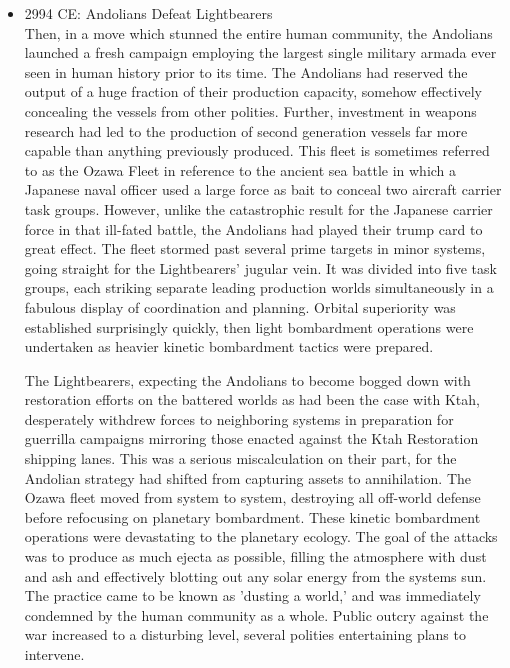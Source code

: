 \begin{itemize}
\item 2994 CE: Andolians Defeat Lightbearers \\

Then, in a move which stunned the entire human community, the
Andolians launched a fresh campaign employing the largest single
military armada ever seen in human history prior to its time.  The
Andolians had reserved the output of a huge fraction of their
production capacity, somehow effectively concealing the vessels from
other polities.  Further, investment in weapons research had led to
the production of second generation vessels far more capable than
anything previously produced.  This fleet is sometimes referred to as the
Ozawa Fleet in reference to the ancient sea battle in which a Japanese
naval officer used a large force as bait to conceal two aircraft
carrier task groups.  However, unlike the catastrophic result for the
Japanese carrier force in that ill-fated battle, the Andolians had
played their trump card to great effect.  The fleet stormed past several
prime targets in minor systems, going straight for the Lightbearers'
jugular vein.  It was divided into five task groups, each striking
separate leading production worlds simultaneously in a fabulous
display of coordination and planning.  Orbital superiority was
established surprisingly quickly, then light bombardment operations
were undertaken as heavier kinetic bombardment tactics were prepared.

The Lightbearers, expecting the Andolians to become bogged down with
restoration efforts on the battered worlds as had been the case with
Ktah, desperately withdrew forces to neighboring systems in
preparation for guerrilla campaigns mirroring those enacted against the
Ktah Restoration shipping lanes.  This was a serious miscalculation on
their part, for the Andolian strategy had shifted from capturing
assets to annihilation.  The Ozawa fleet moved from system to system,
destroying all off-world defense before refocusing on planetary
bombardment.  These kinetic bombardment operations were devastating to
the planetary ecology.  The goal of the attacks was to produce as much
ejecta as possible, filling the atmosphere with dust and ash and
effectively blotting out any solar energy from the systems sun.  The
practice came to be known as 'dusting a world,' and was immediately
condemned by the human community as a whole.  Public outcry against
the war increased to a disturbing level, several polities entertaining
plans to intervene.


\end{itemize}
